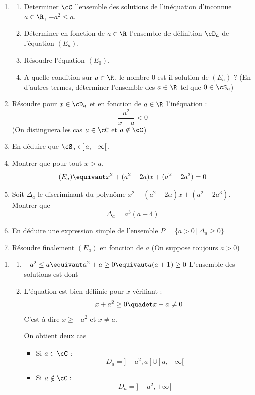 \begin{correction}
\begin{exercice}
\begin{enumerate}
\item 
\begin{enumerate}
\item Determiner $\cC$ l'ensemble des solutions de l'inéquation d'inconnue $a\in \R$, $-a^2\leq a$.
\item Déterminer en fonction de $a\in \R$  l'ensemble de définition $\cD_a$ de l'équation $(E_a)$. 
\item Résoudre l'équation $(E_0)$.
\item A quelle condition sur $a\in \R$, le nombre $0$ est il solution de $(E_a)$ ? (En d'autres termes, déterminer l'ensemble des $a\in \R$ tel que $0\in \cS_a$) 
\end{enumerate}
\item Résoudre pour $x\in \cD_a$ et en fonction de $a\in \R$ l'inéquation : $$\frac{a^2}{x-a} < 0$$
(On distinguera les cas $a\in \cC$ et $a\notin \cC$)
\item En déduire que $\cS_a \subset ]a,+\infty[$. 
\item Montrer que pour tout $x>a$, 
$$(E_a) \equivaut x^2 +(a^2-2a)x +(a^2-2a^3)=0$$
\item Soit $\Delta_a$ le discriminant du polynôme $ x^2 +(a^2-2a)x +(a^2-2a^3)$. 
Montrer que $$\Delta_a =a^3 (a+4)$$
\item En déduire une expression simple de l'ensemble $P =\{ a >0 \, |\, \Delta_a \geq 0\}$

\item Résoudre finalement $(E_a) $ en fonction de $a$ (On suppose toujours $a>0$)


\end{enumerate}

\end{exercice}

\begin{correction}
\begin{enumerate}
\item \begin{enumerate}
\item $-a^2\leq a \equivaut a^2+a\geq 0 \equivaut a(a+1) \geq 0$
L'ensemble des solutions est dont 
\conclusion{$\cC = ]-\infty, -1[ \cup ]0,+\infty[$}

\item L'équation est bien défiinie pour $x$ vérifiant  :
$$x+a^2\geq 0 \quadet x-a\neq 0$$
C'est à dire $x\geq -a^2 $ et $x\neq a$. 

On obtient deux cas 
\begin{itemize}
\item Si $a\in \cC$ :  $$D_a= ]-a^2,a[\cup ]a, +\infty[$$
\item Si $a\notin \cC:$  $$D_a= ]-a^2,+\infty[$$
\end{itemize}  


\end{enumerate}
\end{enumerate}
\end{correction}
\end{correction}
